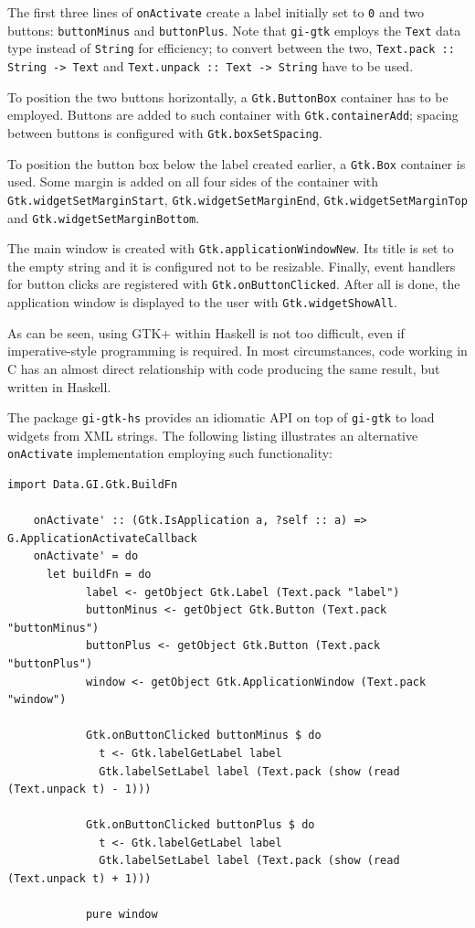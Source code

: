 \documentclass[UdineBachThesis,american,11pt]{PhdThesis}
\begin{document}
  The first three lines of \mbox{\texttt{onActivate}} create a label initially
  set to \texttt{0} and two buttons: \mbox{\texttt{buttonMinus}} and
  \mbox{\texttt{buttonPlus}}. Note that \mbox{\texttt{gi-gtk}} employs the
  \mbox{\texttt{Text}} data type instead of \mbox{\texttt{String}} for
  efficiency; to convert between the two,
  \mbox{\texttt{Text.pack :: String -> Text}} and
  \mbox{\texttt{Text.unpack :: Text -> String}} have to be used.

  To position the two buttons horizontally, a \mbox{\texttt{Gtk.ButtonBox}}
  container has to be employed. Buttons are added to such container with
  \mbox{\texttt{Gtk.containerAdd}}; spacing between buttons is configured with
  \mbox{\texttt{Gtk.boxSetSpacing}}.

  To position the button box below the label created earlier, a
  \mbox{\texttt{Gtk.Box}} container is used. Some margin is added on all four
  sides of the container with \mbox{\texttt{Gtk.widgetSetMarginStart}},
  \mbox{\texttt{Gtk.widgetSetMarginEnd}}, \mbox{\texttt{Gtk.widgetSetMarginTop}}
  and \mbox{\texttt{Gtk.widgetSetMarginBottom}}.

  The main window is created with \mbox{\texttt{Gtk.applicationWindowNew}}. Its
  title is set to the empty string and it is configured not to be resizable.
  Finally, event handlers for button clicks are registered with
  \mbox{\texttt{Gtk.onButtonClicked}}. After all is done, the application window
  is displayed to the user with \mbox{\texttt{Gtk.widgetShowAll}}.

  As can be seen, using GTK+ within Haskell is not too difficult, even if
  imperative-style programming is required. In most circumstances, code working
  in C has an almost direct relationship with code producing the same result,
  but written in Haskell.

  The package \mbox{\texttt{gi-gtk-hs}} provides an idiomatic API on top of
  \mbox{\texttt{gi-gtk}} to load widgets from XML strings. The following listing
  illustrates an alternative \mbox{\texttt{onActivate}} implementation employing
  such functionality:

  \begin{Verbatim}[gobble=4,fontsize=\small]
    import Data.GI.Gtk.BuildFn

    onActivate' :: (Gtk.IsApplication a, ?self :: a) => G.ApplicationActivateCallback
    onActivate' = do
      let buildFn = do
            label <- getObject Gtk.Label (Text.pack "label")
            buttonMinus <- getObject Gtk.Button (Text.pack "buttonMinus")
            buttonPlus <- getObject Gtk.Button (Text.pack "buttonPlus")
            window <- getObject Gtk.ApplicationWindow (Text.pack "window")

            Gtk.onButtonClicked buttonMinus $ do
              t <- Gtk.labelGetLabel label
              Gtk.labelSetLabel label (Text.pack (show (read (Text.unpack t) - 1)))

            Gtk.onButtonClicked buttonPlus $ do
              t <- Gtk.labelGetLabel label
              Gtk.labelSetLabel label (Text.pack (show (read (Text.unpack t) + 1)))

            pure window
  \end{Verbatim}
\end{document}
